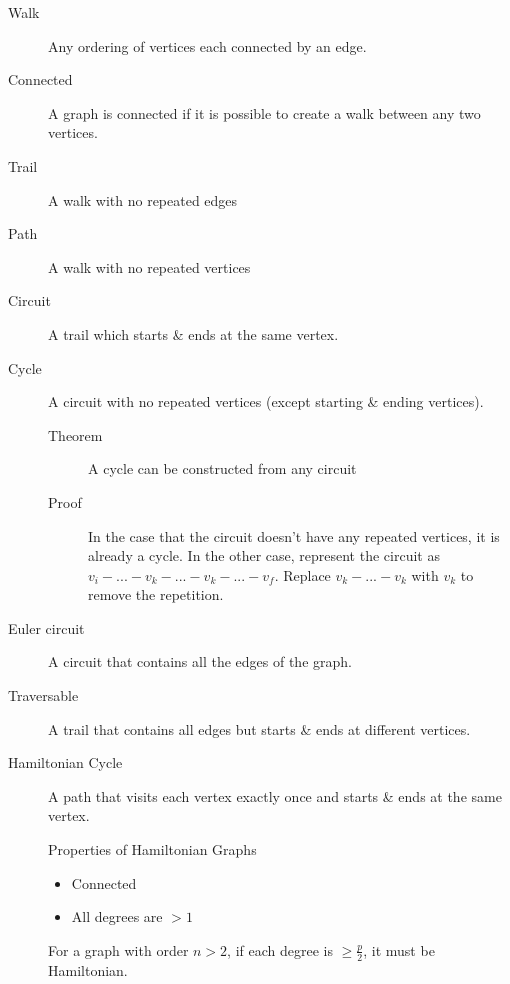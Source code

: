 \begin{description}
    \item[Walk] Any ordering of vertices each connected by
    an edge.

    \item[Connected] A graph is connected if it is possible
    to create a walk between any two vertices.

    \item[Trail] A walk with no repeated edges

    \item[Path] A walk with no repeated vertices

    \item[Circuit] A trail which starts \& ends at the same
    vertex.

    \item[Cycle] A circuit with no repeated vertices
    (except starting \& ending vertices).

    \begin{description}
        \item[Theorem] A cycle can be constructed from
        any circuit

        \item[Proof] In the case that the circuit doesn't
        have any repeated vertices, it is already a cycle.
        In the other case, represent the circuit as
        $v_i - ... - v_k - ... - v_k - ... - v_f$. Replace
        $v_k - ... - v_k$ with $v_k$ to remove the repetition.
    \end{description}

    \item[Euler circuit] A circuit that contains all the
    edges of the graph.

    \item[Traversable] A trail that contains all edges but
    starts \& ends at different vertices.

    \item[Hamiltonian Cycle] A path that visits each vertex
    exactly once and starts \& ends at the same vertex.

    Properties of Hamiltonian Graphs
    \begin{itemize}
        \item Connected
        \item All degrees are $> 1$
    \end{itemize}

    For a graph with order $n > 2$, if each degree is
    $\geq \frac{p}{2}$, it must be Hamiltonian.
\end{description}

